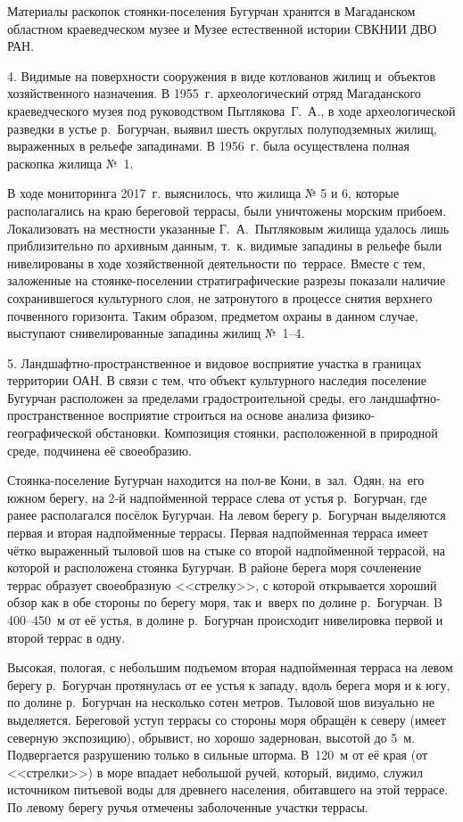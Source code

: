 Материалы раскопок стоянки-поселения Бугурчан хранятся в Магаданском областном краеведческом музее и Музее естественной истории СВКНИИ ДВО РАН.

4. Видимые на поверхности сооружения в виде котлованов жилищ и~объектов хозяйственного назначения. В 1955~г. археологический отряд Магаданского краеведческого музея под руководством Пытлякова~Г.~А., в ходе археологической разведки в устье р.~Богурчан, выявил шесть округлых полуподземных жилищ, выраженных в рельефе западинами. В 1956~г. была осуществлена полная раскопка жилища №~1.

В ходе мониторинга 2017~г. выяснилось, что жилища № 5 и 6, которые располагались на краю береговой террасы, были уничтожены морским прибоем. Локализовать на местности указанные Г.~А.~Пытляковым жилища удалось лишь приблизительно по архивным данным, т.~к. видимые западины в рельефе были нивелированы в ходе хозяйственной деятельности по~террасе. Вместе с тем, заложенные на стоянке-поселении стратиграфические разрезы показали наличие сохранившегося культурного слоя, не затронутого в процессе снятия верхнего почвенного горизонта. Таким образом, предметом охраны в данном случае, выступают снивелированные западины жилищ №~1--4.

5. Ландшафтно-пространственное и видовое восприятие участка в границах территории ОАН. В связи  с тем, что объект культурного наследия поселение Бугурчан расположен за пределами градостроительной среды, его ландшафтно-пространственное восприятие строиться на основе анализа физико-географической обстановки. Композиция стоянки, расположенной в природной среде, подчинена её своеобразию.

Стоянка-поселение Бугурчан находится на пол-ве Кони, в~зал.~Одян, на~его южном берегу, на 2-й надпойменной террасе слева от устья р.~Богурчан, где ранее располагался посёлок Бугурчан. На левом берегу р.~Богурчан выделяются первая и вторая надпойменные террасы. Первая надпойменная терраса имеет чётко выраженный тыловой шов на стыке со второй надпойменной террасой, на которой и расположена стоянка Бугурчан. В районе берега моря сочленение террас образует своеобразную <<стрелку>>, с которой открывается хороший обзор как в обе стороны по берегу моря, так и~вверх по долине р.~Богурчан. B 400--450~м от её устья, в долине р.~Богурчан происходит нивелировка первой и второй террас в одну.

Высокая, пологая, с небольшим подъемом вторая надпойменная терраса на левом берегу р.~Богурчан протянулась от ее устья к западу, вдоль берега моря и к югу, по долине р.~Богурчан на несколько сотен метров. Тыловой шов визуально не выделяется. Береговой уступ террасы со стороны моря обращён к северу (имеет северную экспозицию), обрывист, но хорошо задернован, высотой до 5~м. Подвергается разрушению только в сильные шторма. В~120~м от её края (от <<стрелки>>) в море впадает небольшой ручей, который, видимо, служил источником питьевой воды для древнего населения, обитавшего на этой террасе. По левому берегу ручья отмечены заболоченные участки террасы.

